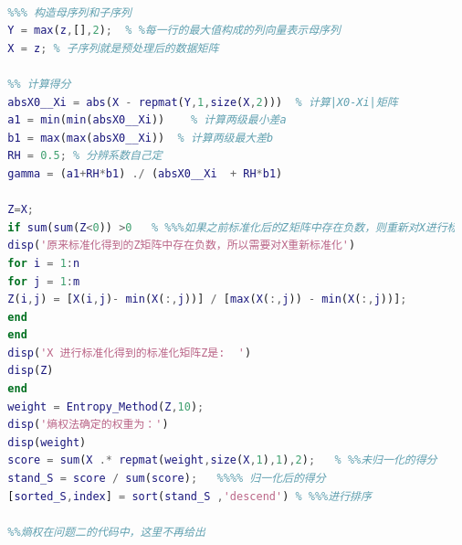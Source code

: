 \documentclass[withoutpreface,bwprint]{cumcmthesis} %
\begin{document}
\begin{appendices}
\begin{lstlisting}[language=matlab]
  
  %%% 构造母序列和子序列
  Y = max(z,[],2);  % %每一行的最大值构成的列向量表示母序列
  X = z; % 子序列就是预处理后的数据矩阵
  
  %% 计算得分
  absX0__Xi = abs(X - repmat(Y,1,size(X,2)))  % 计算|X0-Xi|矩阵
  a1 = min(min(absX0__Xi))    % 计算两级最小差a
  b1 = max(max(absX0__Xi))  % 计算两级最大差b
  RH = 0.5; % 分辨系数自己定
  gamma = (a1+RH*b1) ./ (absX0__Xi  + RH*b1)  
  
  Z=X;
  if sum(sum(Z<0)) >0   % %%%如果之前标准化后的Z矩阵中存在负数，则重新对X进行标准化%%%%
  disp('原来标准化得到的Z矩阵中存在负数，所以需要对X重新标准化')
  for i = 1:n
  for j = 1:m
  Z(i,j) = [X(i,j)- min(X(:,j))] / [max(X(:,j)) - min(X(:,j))];
  end
  end
  disp('X 进行标准化得到的标准化矩阵Z是:  ')
  disp(Z)
  end
  weight = Entropy_Method(Z,10);
  disp('熵权法确定的权重为：')
  disp(weight)
  score = sum(X .* repmat(weight,size(X,1),1),2);   % %%未归一化的得分
  stand_S = score / sum(score);   %%%% 归一化后的得分
  [sorted_S,index] = sort(stand_S ,'descend') % %%%进行排序
  
  %%熵权在问题二的代码中，这里不再给出
  
  
  
\end{lstlisting}




\end{appendices}
\end{document}
